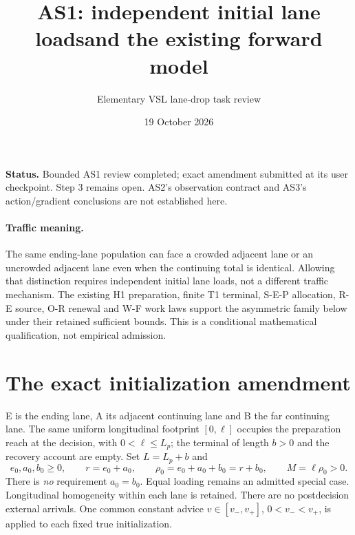 \documentclass[11pt,a4paper]{article}
\title{AS1: independent initial lane loads\newline and the existing forward model}
\author{Elementary VSL lane-drop task review}
\date{19 October 2026}
\begin{document}
\maketitle
\noindent\textbf{Status.} Bounded AS1 review completed; exact amendment
submitted at its user checkpoint. Step 3 remains open. AS2's observation
contract and AS3's action/gradient conclusions are not established here.

\paragraph{Traffic meaning.}
The same ending-lane population can face a crowded adjacent lane or an
uncrowded adjacent lane even when the continuing total is identical.
Allowing that distinction requires independent initial lane loads, not a
different traffic mechanism. The existing H1 preparation, finite T1
terminal, S-E-P allocation, R-E source, O-R renewal and W-F work laws
support the asymmetric family below under their retained sufficient bounds.
This is a conditional mathematical qualification, not empirical admission.

\section{The exact initialization amendment}
E is the ending lane, A its adjacent continuing lane and B the far continuing
lane. The same uniform longitudinal footprint $[0,\ell]$ occupies the
preparation reach at the decision, with $0<\ell\leq L_p$; the terminal of
length $b>0$ and the recovery account are empty. Set $L=L_p+b$ and
\begin{equation}
 e_0,a_0,b_0\geq0,\qquad r=e_0+a_0,\qquad
 \rho_0=e_0+a_0+b_0=r+b_0,\qquad M=\ell\rho_0>0.
 \label{eq:initial}
\end{equation}
There is \emph{no} requirement $a_0=b_0$. Equal loading remains an admitted
special case. Longitudinal homogeneity within each lane is retained.
There are no postdecision external arrivals. One common constant advice
$v\in[v_-,v_+]$, $0<v_-<v_+$, is applied to each fixed true initialization.
\end{document}
